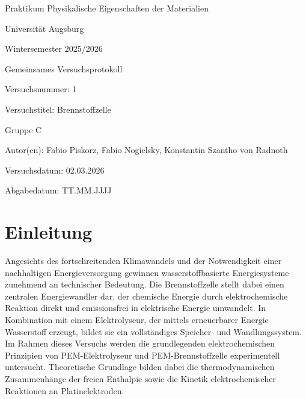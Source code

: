\documentclass[11pt,a4paper]{article}
\numberwithin{equation}{section}
\newcommand{\Lehrveranstaltung}{Praktikum Physikalische Eigenschaften der Materialien}
\newcommand{\Universitaet}{Universität Augsburg}
\newcommand{\Semester}{Wintersemester 2025/2026}
\newcommand{\Versuchsnummer}{1}
\newcommand{\Versuchstitel}{Brennstoffzelle}
\newcommand{\Gruppe}{C}
\newcommand{\Versuchsdatum}{02.03.2026}
\newcommand{\Abgabedatum}{TT.MM.JJJJ}
\newcommand{\Abgabeart}{Gemeinsames Versuchsprotokoll}
\newcommand{\Autor}{Fabio Piskorz, Fabio Nogielsky, Konstantin Szantho von Radnoth}
\begin{document}

\begin{titlepage}
    \centering
    \vspace{1.0cm}
    {\Large \Lehrveranstaltung\par}
    \vspace{0.5cm}
    {\large \Universitaet\par}
    \vspace{0.5cm}
    {\large \Semester\par}
    \vspace{1.5cm}
    {\LARGE \Abgabeart\par}
    \vspace{0.5cm}
    {\Large Versuchsnummer: \Versuchsnummer\par}
    \vspace{0.5cm}
    {\Large Versuchstitel: \Versuchstitel\par}
    \vspace{1.5cm}
    {\large Gruppe \Gruppe\par}
    \vspace{0.5cm}
    {\large Autor(en): \Autor\par}
    \vspace{1.5cm}
    {\large Versuchsdatum: \Versuchsdatum\par}
    \vspace{0.5cm}
    {\large Abgabedatum: \Abgabedatum\par}
    \vfill
\end{titlepage}


\tableofcontents
\newpage

\section{Einleitung}

Angesichts des fortschreitenden Klimawandels und der Notwendigkeit einer nachhaltigen Energieversorgung gewinnen wasserstoffbasierte Energiesysteme zunehmend an technischer Bedeutung. Die Brennstoffzelle stellt dabei einen zentralen Energiewandler dar, der chemische Energie durch elektrochemische Reaktion direkt und emissionsfrei in elektrische Energie umwandelt. In Kombination mit einem Elektrolyseur, der mittels erneuerbarer Energie Wasserstoff erzeugt, bildet sie ein vollständiges Speicher- und Wandlungssystem.
\newline Im Rahmen dieses Versuchs werden die grundlegenden elektrochemischen 
Prinzipien von PEM-Elektrolyseur und PEM-Brennstoffzelle experimentell untersucht. Theoretische Grundlage bilden dabei die thermodynamischen Zusammenhänge der freien Enthalpie sowie die Kinetik elektrochemischer Reaktionen an Platinelektroden.
\end{document}
